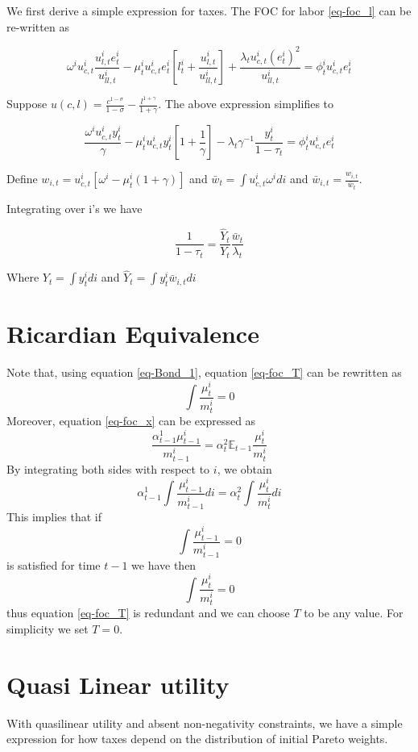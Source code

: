 \documentclass[thmsb,11pt]{article}
\newcommand{\EE}{\mathbb E}
\begin{document}
We first derive a simple expression for taxes. The FOC for labor \eqref{eq-foc_l} can be re-written as 


 \[
\omega^i u^i_{c,t}\frac{u^i_{l,t} e^i_t}{u^i_{ll,t}}- \mu^i_t u^i_{c,t}e^i_t[l^i_t +\frac{u^i_{l,t}}{u^i_{ll,t}}]+\frac{\lambda_t u^i_{c,t}(e^i_t)^2}{u^i_{ll,t}}=\phi^i_tu^i_{c,t}e^i_t    	
\]

 Suppose $u(c,l)=\frac{c^{1-\sigma}}{1-\sigma}-\frac{l^{1+\gamma}}{1+\gamma}$. The above expression simplifies to


 \[
\frac{ \omega^i u^i_{c,t}y^i_t}{\gamma}- \mu^i_t u^i_{c,t}y^i_t[1 +\frac{1}{\gamma}]-\lambda_t\gamma^{- 1}\frac{y^i_t }{1-\tau_t}=\phi^i_tu^i_{c,t}e^i_t    	
 \]

Define $w_{i,t}=u^i_{c,t}[\omega^i-\mu^i_t(1+\gamma)]$ and $\bar{w}_{t} = \int u^i_{c,t}\omega^i di$ and $\bar{w}_{i,t}=\frac{w_{i,t}}{\bar{w}_t}$.

Integrating  over i's we have

 
\begin{equation}
	\label{eq-labor_taxes}
\frac{1}{1-\tau_t}=\frac{\hat{Y}_t}{Y_t} \frac{\bar{w}_t }{\lambda_t}
\end{equation}   

Where $Y_t=\int y^i_t di$ and $\hat{Y}_t=\int y^i_t \bar{w}_{i,t}di$
\section{Ricardian Equivalence}
Note that, using equation \eqref{eq-Bond_1}, equation \eqref{eq-foc_T} can be rewritten as 
\[
	\int \frac{\mu^i_t}{m^i_t} = 0
\]  Moreover, equation \eqref{eq-foc_x} can be expressed as
\[
\frac{\alpha^1_{t-1} \mu^i_{t-1}}{m^i_{t-1}} = \alpha^2_t \EE_{t-1} \frac{\mu^i_t}{m^i_t}
\]By integrating both sides with respect to $i$, we obtain
\[
	\alpha^1_{t-1} \int \frac{\mu^i_{t-1}}{m^i_{t-1}}di = \alpha^2_t\int \frac{\mu^i_{t}}{m^i_t} di
\]  This implies that if 
\[
	\int \frac{\mu^i_{t-1}}{m^i_{t-1}} = 0
\]is satisfied for time $t-1$ we have then
\[
	\int \frac{\mu^i_t}{m^i_t} = 0
\] thus equation \eqref{eq-foc_T} is redundant and we can choose $T$ to be any value.  For simplicity we set $T=0$.

\section{Quasi Linear utility}
With quasilinear utility and absent non-negativity constraints, we have a simple expression for how taxes depend on the distribution of initial Pareto weights.
\end{document}
